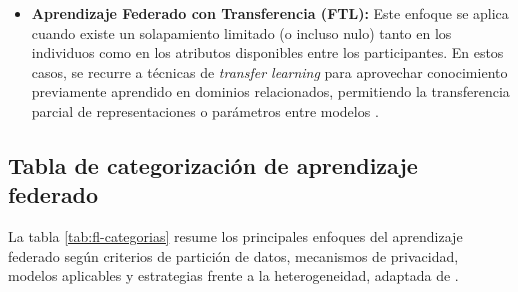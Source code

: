 \documentclass{report}
\begin{document}
\begin{itemize}
    \item \textbf{Aprendizaje Federado con Transferencia (FTL):}  
    Este enfoque se aplica cuando existe un solapamiento limitado (o incluso nulo) tanto en los individuos como en los atributos disponibles entre los participantes.  
    En estos casos, se recurre a técnicas de \textit{transfer learning} para aprovechar conocimiento previamente aprendido en dominios relacionados, permitiendo la transferencia parcial de representaciones o parámetros entre modelos \cite{yang2019federated,li2020federated}.
\end{itemize}

\subsection{Tabla de categorización de aprendizaje federado}
\label{sec:fl-table}

La tabla \ref{tab:fl-categorias} resume los principales enfoques del aprendizaje federado según criterios de partición de datos, mecanismos de privacidad, modelos aplicables y estrategias frente a la heterogeneidad, adaptada de \cite{zhang2021survey}.
\end{document}
